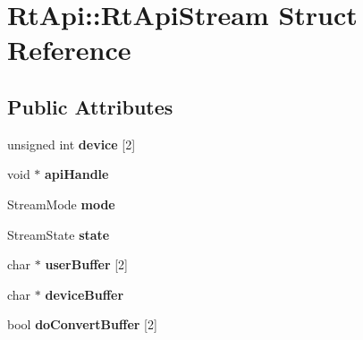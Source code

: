 \hypertarget{struct_rt_api_1_1_rt_api_stream}{}\section{Rt\+Api\+:\+:Rt\+Api\+Stream Struct Reference}
\label{struct_rt_api_1_1_rt_api_stream}
\subsection*{Public Attributes}
\begin{DoxyCompactItemize}
\item 
unsigned int {\bfseries device} \mbox{[}2\mbox{]}\hypertarget{struct_rt_api_1_1_rt_api_stream_a38633b94968f0bde718b6124f91649c4}{}\label{struct_rt_api_1_1_rt_api_stream_a38633b94968f0bde718b6124f91649c4}

\item 
void $\ast$ {\bfseries api\+Handle}\hypertarget{struct_rt_api_1_1_rt_api_stream_a7e3a1a42bb786be6dd4085540a56e49f}{}\label{struct_rt_api_1_1_rt_api_stream_a7e3a1a42bb786be6dd4085540a56e49f}

\item 
Stream\+Mode {\bfseries mode}\hypertarget{struct_rt_api_1_1_rt_api_stream_a5989e685a5bbe545705a962caa66c259}{}\label{struct_rt_api_1_1_rt_api_stream_a5989e685a5bbe545705a962caa66c259}

\item 
Stream\+State {\bfseries state}\hypertarget{struct_rt_api_1_1_rt_api_stream_accf19137332f916e96dd35f0f4259697}{}\label{struct_rt_api_1_1_rt_api_stream_accf19137332f916e96dd35f0f4259697}

\item 
char $\ast$ {\bfseries user\+Buffer} \mbox{[}2\mbox{]}\hypertarget{struct_rt_api_1_1_rt_api_stream_a67b21c4ad9f22c91f605d2b24a96c87a}{}\label{struct_rt_api_1_1_rt_api_stream_a67b21c4ad9f22c91f605d2b24a96c87a}

\item 
char $\ast$ {\bfseries device\+Buffer}\hypertarget{struct_rt_api_1_1_rt_api_stream_a253293c901cfb48e3d7a7abb76ea80b7}{}\label{struct_rt_api_1_1_rt_api_stream_a253293c901cfb48e3d7a7abb76ea80b7}

\item 
bool {\bfseries do\+Convert\+Buffer} \mbox{[}2\mbox{]}\hypertarget{struct_rt_api_1_1_rt_api_stream_a5ea1c0ba6fc1f41360e8c7f759078b00}{}\label{struct_rt_api_1_1_rt_api_stream_a5ea1c0ba6fc1f41360e8c7f759078b00}


\end{DoxyCompactItemize}
